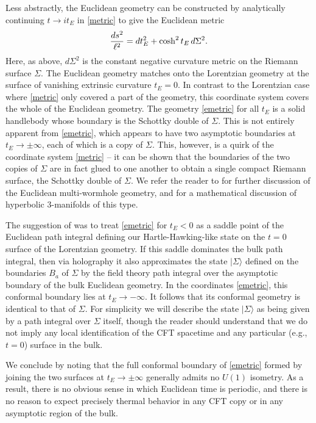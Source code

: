 \documentclass[12pt]{article}
\newcommand{\be}{\begin{equation}}
\newcommand{\ee}{\end{equation}}
\numberwithin{equation}{section}
\begin{document}
Less abstractly, the Euclidean geometry can be constructed by analytically continuing $t \to i t_E$ in \eqref{metric} to give the Euclidean metric
%
\be \label{emetric}
{ds^2\over\ell^2} = dt_E^2 + \cosh^2 t_E \, d\Sigma^2.
\ee
%
Here, as above, $d\Sigma^2$ is the constant negative curvature metric on the Riemann surface $\Sigma$.  The Euclidean geometry matches onto the Lorentzian geometry at the surface of vanishing extrinsic curvature $t_E=0$. In contrast to the Lorentzian case where \eqref{metric} only covered a part of the geometry, this coordinate system covers the whole of the Euclidean geometry. The geometry \eqref{emetric} for all $t_E$ is a solid handlebody whose boundary is the Schottky double of $\Sigma$.  This is not entirely apparent from \eqref{emetric}, which appears to have two asymptotic boundaries at $t_E\to \pm \infty$, each of which is a copy of $\Sigma$.  This, however, is a quirk of the coordinate system \eqref{metric} --  it can be shown that the boundaries of the two copies of $\Sigma$ are in fact glued to one another to obtain a single compact Riemann surface, the Schottky double of $\Sigma$.   We refer the reader to \cite{Krasnov:2000zq, Skenderis:2009ju} for further discussion of the Euclidean multi-wormhole geometry, and \cite{maskit1987kleinian} for a mathematical discussion of hyperbolic 3-manifolds of this type.

The suggestion of \cite{Maldacena:2001kr,Skenderis:2009ju} was to treat \eqref{emetric} for $t_E <0$ as a saddle point of the Euclidean path integral defining our Hartle-Hawking-like state on the $t=0$ surface of the Lorentzian geometry.  If this saddle dominates the bulk path integral, then via holography it also approximates the state $|\Sigma\rangle$ defined on the boundaries $B_a$ of $\Sigma$ by the field theory path integral over the asymptotic boundary of the bulk Euclidean geometry. In the coordinates \eqref{emetric}, this conformal boundary lies at $t_E \to -\infty$.  It follows that its conformal geometry is identical to that of $\Sigma$.  For simplicity we will describe the state $|\Sigma\rangle$ as being given by a path integral over $\Sigma$ itself, though the reader should understand that we do not imply any local identification of the CFT spacetime and any particular (e.g., $t=0$) surface in the bulk.

We conclude by noting that the full conformal boundary of \eqref{emetric} formed by joining the two surfaces at $t_E \rightarrow \pm \infty$ generally admits no $U(1)$ isometry.  As a result, there is no obvious sense in which Euclidean time is periodic, and there is no reason to expect precisely thermal behavior in any CFT copy or in any asymptotic region of the bulk.
\end{document}

